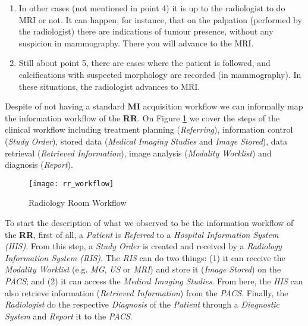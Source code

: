 \begin{enumerate}
\item In other cases (not mentioned in point 4) it is up to the radiologist to do MRI or not. It can happen, for instance, that on the palpation (performed by the radiologist) there are indications of tumour presence, without any suspicion in mammography. There you will advance to the MRI.

\item Still about point 5, there are cases where the patient is followed, and calcifications with suspected morphology are recorded (in mammography). In these situations, the radiologist advances to MRI.

\end{enumerate}

\hfill


Despite of not having a standard \textbf{MI} acquisition workflow we can informally map the information workflow of the \textbf{RR}. On Figure \ref{fig:rr_workflow} we cover the steps of the clinical workflow including treatment planning (\textit{Referring}), information control (\textit{Study Order}), stored data (\textit{Medical Imaging Studies} and \textit{Image Stored}), data retrieval (\textit{Retrieved Information}), image analysis (\textit{Modality Worklist}) and diagnosis (\textit{Report}).


\hfill

\begin{figure}[h]
\centering
\texttt{[image: rr\_workflow]}
\caption{Radiology Room Workflow}
\label{fig:rr_workflow}
\end{figure}

\hfill


To start the description of what we observed to be the information workflow of the \textbf{RR}, first of all, a \textit{Patient} is \textit{Referred} to a \textit{Hospital Information System (HIS)}. From this step, a \textit{Study Order} is created and received by a \textit{Radiology Information System (RIS)}. The \textit{RIS} can do two things: (1) it can receive the \textit{Modality Worklist} (e.g. \textit{MG}, \textit{US} or \textit{MRI}) and store it (\textit{Image Stored}) on the \textit{PACS}; and (2) it can access the \textit{Medical Imaging Studies}. From here, the \textit{HIS} can also retrieve  information (\textit{Retrieved Information}) from the \textit{PACS}. Finally, the \textit{Radiologist} do the respective \textit{Diagnosis} of the \textit{Patient} through a \textit{Diagnostic System} and \textit{Report} it to the \textit{PACS}.

